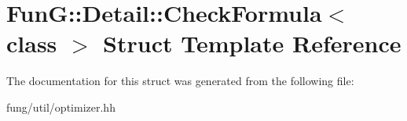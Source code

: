 \hypertarget{classFunG_1_1Detail_1_1CheckFormula}{\section{Fun\-G\-:\-:Detail\-:\-:Check\-Formula$<$ class $>$ Struct Template Reference}
\label{classFunG_1_1Detail_1_1CheckFormula}
}


The documentation for this struct was generated from the following file\-:\begin{DoxyCompactItemize}
\item 
fung/util/optimizer.\-hh\end{DoxyCompactItemize}
